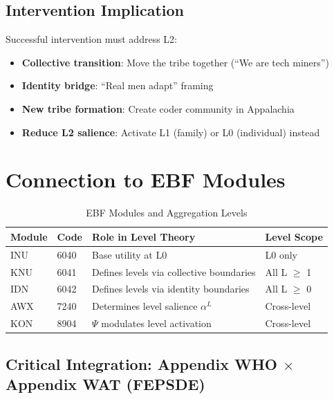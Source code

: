 \subsection{Intervention Implication}

Successful intervention must address L2:
\begin{itemize}
\item \textbf{Collective transition}: Move the tribe together (``We are tech miners'')
\item \textbf{Identity bridge}: ``Real men adapt'' framing
\item \textbf{New tribe formation}: Create coder community in Appalachia
\item \textbf{Reduce L2 salience}: Activate L1 (family) or L0 (individual) instead
\end{itemize}

\section{Connection to EBF Modules}
\label{sec:aaa-bcm-connection}

\begin{table}[htbp]
\centering
\caption{EBF Modules and Aggregation Levels}
\label{tab:aaa-bcm-modules}
\renewcommand{\arraystretch}{1.4}
\begin{tabular}{@{}llll@{}}
\toprule
\textbf{Module} & \textbf{Code} & \textbf{Role in Level Theory} & \textbf{Level Scope} \\
\midrule
INU & 6040 & Base utility at L0 & L0 only \\
KNU & 6041 & Defines levels via collective boundaries & All L $\geq$ 1 \\
IDN & 6042 & Defines levels via identity boundaries & All L $\geq$ 0 \\
AWX & 7240 & Determines level salience $\alpha^L$ & Cross-level \\
KON & 8904 & $\Psi$ modulates level activation & Cross-level \\
\bottomrule
\end{tabular}
\end{table}

\subsection{Critical Integration: Appendix WHO $\times$ Appendix WAT (FEPSDE)}
\label{subsec:aaa-c-integration}

